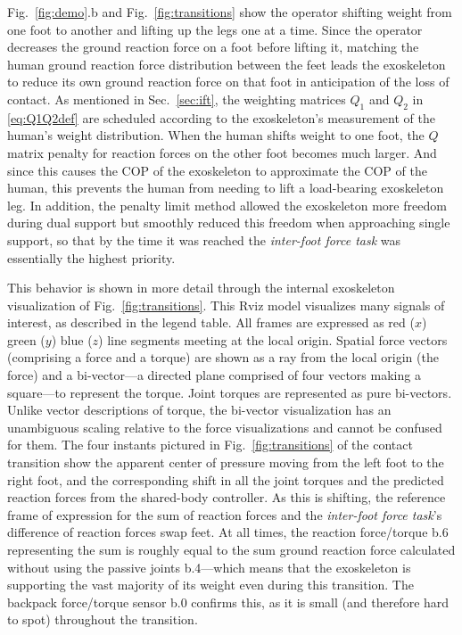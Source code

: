\documentclass[utf8]{frontiersSCNS}
\newcommand{\add}[1]{\textcolor[HTML]{8710b3}{#1}}
\begin{document}
Fig.~\ref{fig:demo}.b and Fig.~\ref{fig:transitions} show the operator shifting weight from one foot to another and lifting up the legs one at a time.
\add{Since the operator decreases the ground reaction force on a foot before lifting it, matching the human ground reaction force distribution between the feet leads the exoskeleton to reduce its own ground reaction force on that foot in anticipation of the loss of contact.} 
As mentioned in Sec.~\ref{sec:ift}, the weighting matrices $Q_1$ and $Q_2$ in \eqref{eq:Q1Q2def} are scheduled according to the exoskeleton's measurement of the human's weight distribution.
When the human shifts weight to one foot, the $Q$ matrix penalty for reaction forces on the other foot becomes much larger. And since this causes the COP of the exoskeleton to approximate the COP of the human, this prevents the human from needing to lift a load-bearing exoskeleton leg. In addition, the penalty limit method allowed the exoskeleton more freedom during dual support but smoothly reduced this freedom when approaching single support, so that by the time it was reached the \emph{inter-foot force task} was essentially the highest priority.
 
 This behavior is shown in more detail through the internal exoskeleton visualization of Fig.~\ref{fig:transitions}.
 This Rviz model \add{visualizes many signals of interest}, as described in the legend table.
 All frames are expressed as red ($x$) green ($y$) blue ($z$) line segments meeting at the local origin.
 Spatial force vectors (comprising a force and a torque) are shown as a ray from the local origin (the force) and a bi-vector---a directed plane comprised of four vectors making a square---to represent the torque. Joint torques are represented as pure bi-vectors.
 Unlike vector descriptions of torque, the bi-vector visualization has an unambiguous scaling relative to the force visualizations and cannot be confused for them.
 The four instants pictured in Fig.~\ref{fig:transitions} of the contact transition show the apparent center of pressure moving from the left foot to the right foot, and the corresponding shift in all the joint torques and the predicted reaction forces from the shared-body controller.
 As this is shifting, the reference frame of expression for the sum of reaction forces and the \emph{inter-foot force task}'s difference of reaction forces swap feet.
 At all times, the reaction force/torque b.6 representing the sum is roughly equal to the sum ground reaction force calculated without using the passive joints b.4---which means that the exoskeleton is supporting the vast majority of its weight even during this transition.
 The backpack force/torque sensor b.0 confirms this, as it is small (and therefore hard to spot) throughout the transition.
\end{document}
